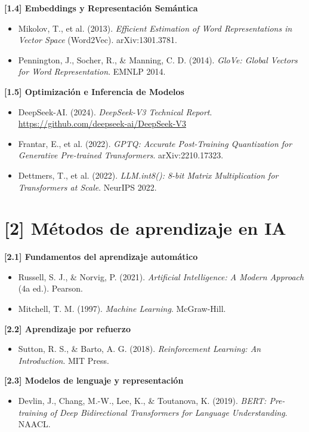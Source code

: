\documentclass[12pt,a4paper]{report}
\numberwithin{figure}{section}
\begin{document}
\textbf{[1.4] Embeddings y Representación Semántica}
\begin{itemize}
  \item Mikolov, T., et al. (2013). \textit{Efficient Estimation of Word Representations in Vector Space} (Word2Vec). arXiv:1301.3781.
  \item Pennington, J., Socher, R., \& Manning, C. D. (2014). \textit{GloVe: Global Vectors for Word Representation}. EMNLP 2014.
\end{itemize}

\textbf{[1.5] Optimización e Inferencia de Modelos}
\begin{itemize}
  \item DeepSeek-AI. (2024). \textit{DeepSeek-V3 Technical Report}. \url{https://github.com/deepseek-ai/DeepSeek-V3}
  \item Frantar, E., et al. (2022). \textit{GPTQ: Accurate Post-Training Quantization for Generative Pre-trained Transformers}. arXiv:2210.17323.
  \item Dettmers, T., et al. (2022). \textit{LLM.int8(): 8-bit Matrix Multiplication for Transformers at Scale}. NeurIPS 2022.
\end{itemize}

\section*{[2] Métodos de aprendizaje en IA}
\label{ref:2}

\textbf{[2.1] Fundamentos del aprendizaje automático}
\label{ref:2.1}
\begin{itemize}
  \item Russell, S. J., \& Norvig, P. (2021). \textit{Artificial Intelligence: A Modern Approach} (4a ed.). Pearson.
  \item Mitchell, T. M. (1997). \textit{Machine Learning}. McGraw-Hill.
\end{itemize}

\textbf{[2.2] Aprendizaje por refuerzo}
\label{ref:2.2}
\begin{itemize}
  \item Sutton, R. S., \& Barto, A. G. (2018). \textit{Reinforcement Learning: An Introduction}. MIT Press.
\end{itemize}

\textbf{[2.3] Modelos de lenguaje y representación}
\label{ref:2.3}
\begin{itemize}
  \item Devlin, J., Chang, M.-W., Lee, K., \& Toutanova, K. (2019). \textit{BERT: Pre-training of Deep Bidirectional Transformers for Language Understanding}. NAACL.
\end{itemize}
\end{document}
